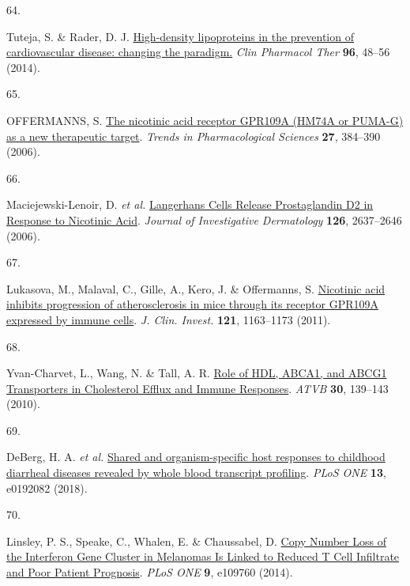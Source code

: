 \documentclass[
  a4paper,
]{article}
\newlength{\cslhangindent}
\newlength{\csllabelwidth}
\newlength{\cslentryspacingunit} %
\newenvironment{CSLReferences}[2] %
 {%
  \setlength{\parindent}{0pt}
  \ifodd #1
  \let\oldpar\par
  \def\par{\hangindent=\cslhangindent\oldpar}
  \fi
  \setlength{\parskip}{#2\cslentryspacingunit}
 }%
 {}
\newcommand{\CSLLeftMargin}[1]{\parbox[t]{\csllabelwidth}{#1}}
\newcommand{\CSLRightInline}[1]{\parbox[t]{\linewidth - \csllabelwidth}{#1}\break}
\begin{document}
\begin{CSLReferences}{0}{0}
\leavevmode{}%
\CSLLeftMargin{64. }%
\CSLRightInline{Tuteja, S. \& Rader, D. J. \href{https://doi.org/10.1038/clpt.2014.79}{High-density lipoproteins in the prevention of cardiovascular disease: changing the paradigm.} \emph{Clin Pharmacol Ther} \textbf{96}, 48--56 (2014).}

\leavevmode{}%
\CSLLeftMargin{65. }%
\CSLRightInline{OFFERMANNS, S. \href{https://doi.org/10.1016/j.tips.2006.05.008}{The nicotinic acid receptor GPR109A (HM74A or PUMA-G) as a new therapeutic target}. \emph{Trends in Pharmacological Sciences} \textbf{27}, 384--390 (2006).}

\leavevmode{}%
\CSLLeftMargin{66. }%
\CSLRightInline{Maciejewski-Lenoir, D. \emph{et al.} \href{https://doi.org/10.1038/sj.jid.5700586}{Langerhans Cells Release Prostaglandin D2 in Response to Nicotinic Acid}. \emph{Journal of Investigative Dermatology} \textbf{126}, 2637--2646 (2006).}

\leavevmode{}%
\CSLLeftMargin{67. }%
\CSLRightInline{Lukasova, M., Malaval, C., Gille, A., Kero, J. \& Offermanns, S. \href{https://doi.org/10.1172/jci41651}{Nicotinic acid inhibits progression of atherosclerosis in mice through its receptor GPR109A expressed by immune cells}. \emph{J. Clin. Invest.} \textbf{121}, 1163--1173 (2011).}

\leavevmode{}%
\CSLLeftMargin{68. }%
\CSLRightInline{Yvan-Charvet, L., Wang, N. \& Tall, A. R. \href{https://doi.org/10.1161/atvbaha.108.179283}{Role of HDL, ABCA1, and ABCG1 Transporters in Cholesterol Efflux and Immune Responses}. \emph{ATVB} \textbf{30}, 139--143 (2010).}

\leavevmode{}%
\CSLLeftMargin{69. }%
\CSLRightInline{DeBerg, H. A. \emph{et al.} \href{https://doi.org/10.1371/journal.pone.0192082}{Shared and organism-specific host responses to childhood diarrheal diseases revealed by whole blood transcript profiling}. \emph{PLoS ONE} \textbf{13}, e0192082 (2018).}

\leavevmode{}%
\CSLLeftMargin{70. }%
\CSLRightInline{Linsley, P. S., Speake, C., Whalen, E. \& Chaussabel, D. \href{https://doi.org/10.1371/journal.pone.0109760}{Copy Number Loss of the Interferon Gene Cluster in Melanomas Is Linked to Reduced T Cell Infiltrate and Poor Patient Prognosis}. \emph{PLoS ONE} \textbf{9}, e109760 (2014).}


\end{CSLReferences}
\end{document}
